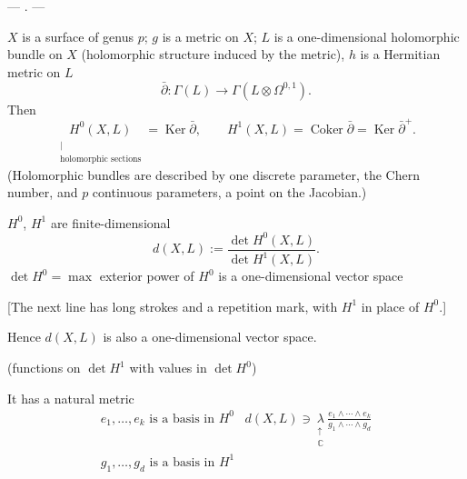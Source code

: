 \begin{center}— . —\end{center}
$X$ is a surface of genus $p$; $g$ is a metric on $X$;
$L$ is a one-dimensional holomorphic bundle on $X$
(holomorphic structure induced by the metric), $h$ is a Hermitian metric on $L$
\begin{equation*}
\bar\partial:\Gamma(L)\longrightarrow\Gamma(L\otimes\Omega^{0,1}).\tag{4}
\end{equation*}
Then
\begin{equation*}
\underset{\substack{|\\\text{holomorphic sections}}}{H^0(X,L)}
=\operatorname{Ker}\bar\partial,\qquad
H^1(X,L)=\operatorname{Coker}\bar\partial=\operatorname{Ker}\bar\partial^{+}.
\tag{5}
\end{equation*}
(Holomorphic bundles are described by one discrete parameter, the Chern number, and $p$ continuous parameters, a point on the Jacobian.)

$H^0$, $H^1$ are finite-dimensional
\begin{equation*}
d(X,L):=\frac{\det H^0(X,L)}{\det H^1(X,L)}.\tag{6}
\end{equation*}
$\det H^0=\max$ exterior power of $H^0$ is a one-dimensional vector space

[The next line has long strokes and a repetition mark, with $H^1$ in place of $H^0$.]

Hence $d(X,L)$ is also a one-dimensional vector space.

(functions on $\det H^1$ with values in $\det H^0$)

It has a natural metric
\begin{equation*}
\begin{array}{l|l}
e_1,\ldots,e_k\text{ is a basis in }H^0&
\displaystyle d(X,L)\ni
\underset{\substack{\uparrow\\\mathbb C}}{\lambda}
\frac{e_1\wedge\cdots\wedge e_k}{g_1\wedge\cdots\wedge g_d}\\
g_1,\ldots,g_d\text{ is a basis in }H^1&
\end{array}
\end{equation*}


